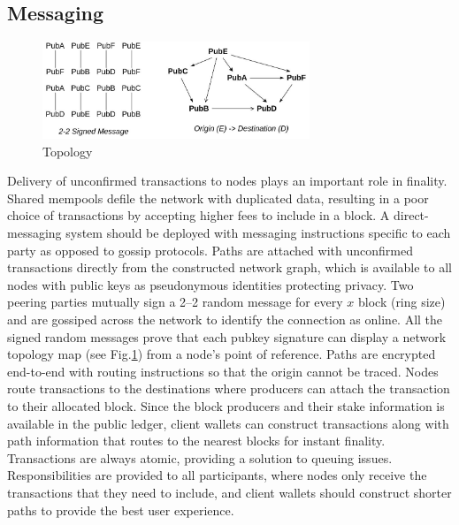 \documentclass[a4paper,10pt]{article}
\begin{document}
\subsection{Messaging}
\begin{figure}[h]
\begin{center}
\includegraphics[width=8cm]{topology}
\caption{Topology}
\label{topology}
\end{center}
\end{figure}
Delivery of unconfirmed transactions to nodes plays an important role in finality. Shared mempools defile the network with duplicated data, resulting in a poor choice of transactions by accepting higher fees to include in a block. A direct-messaging system should be deployed with messaging instructions specific to each party as opposed to gossip protocols. Paths are attached with unconfirmed transactions directly from the constructed network graph, which is available to all nodes with public keys as pseudonymous identities protecting privacy. Two peering parties mutually sign a 2–2 random message for every $x$ block (ring size) and are gossiped across the network to identify the connection as online. All the signed random messages prove that each pubkey signature can display a network topology map (see Fig.\ref{topology}) from a node's point of reference. Paths are encrypted end-to-end with routing \cite{poon2016bitcoin} instructions so that the origin cannot be traced. Nodes route transactions to the destinations where producers can attach the transaction to their allocated block. Since the block producers and their stake information is available in the public ledger, client wallets can construct transactions along with path information that routes to the nearest blocks for instant finality. Transactions are always atomic, providing a solution to queuing issues. Responsibilities are provided to all participants, where nodes only receive the transactions that they need to include, and client wallets should construct shorter paths to provide the best user experience.
\end{document}
